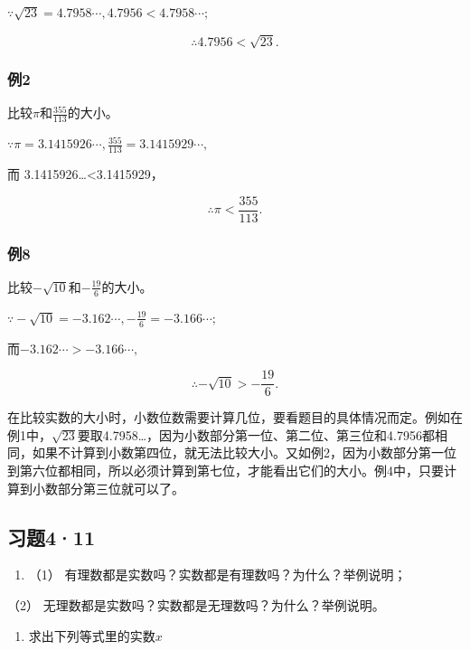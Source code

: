 \(\because \sqrt{23} = 4.7958\cdots, 4.7956 < 4.7958\cdots;\)

\[
\therefore 4.7956 <   \sqrt {23}.
\]

\subsubsection{例2}

比较\(\pi\)和\(\frac{355}{113}\)的大小。

\(\because \pi = 3.1415926\cdots, \frac{355}{113} = 3.1415929\cdots,\)

而 3.1415926\ldots\textless3.1415929，

\[
\therefore \pi <   \frac{355}{113}.
\]

\subsubsection{例8}

比较\(-\sqrt{10}\)和\(-\frac{19}{6}\)的大小。

\(\because -\sqrt{10} = -3.162\cdots, -\frac{19}{6} = -3.166\cdots;\)

而\(-3.162\cdots > -3.166\cdots,\)

\[
\therefore - \sqrt {10} > - \frac{19}{6}.
\]

在比较实数的大小时，小数位数需要计算几位，要看题目的具体情况而定。例如在例1中，\(\sqrt{23}\)要取4.7958\ldots，因为小数部分第一位、第二位、第三位和4.7956都相同，如果不计算到小数第四位，就无法比较大小。又如例2，因为小数部分第一位到第六位都相同，所以必须计算到第七位，才能看出它们的大小。例4中，只要计算到小数部分第三位就可以了。

\subsection{习题4·11}

\begin{enumerate}
\item
  （1） 有理数都是实数吗？实数都是有理数吗？为什么？举例说明；
\end{enumerate}

（2） 无理数都是实数吗？实数都是无理数吗？为什么？举例说明。

\begin{enumerate}[start=2]
\item
  求出下列等式里的实数\(x\)
\end{enumerate}

